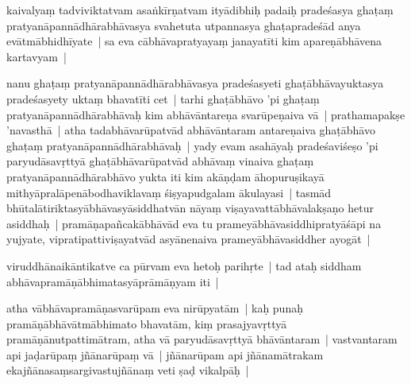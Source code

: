 \documentclass[article,12pt,a4paper]{memoir}%
\newcounter{parCount}
\begin{document}
	  \pstart \leavevmode%
	kaivalyaṃ tadviviktatvam asaṅkīrṇatvam ityādibhiḥ padaiḥ pradeśasya ghaṭaṃ pratyanāpannādhārabhāvasya svahetuta utpannasya ghaṭapradeśād anya evātmābhidhīyate | sa eva cābhāvapratyayaṃ janayatīti kim apareṇābhāvena kartavyam |
	{}
	\pend%
      

	  \pstart \leavevmode%
	\label{thakur75-104.24}nanu ghaṭaṃ pratyanāpannādhārabhāvasya pradeśasyeti ghaṭābhāvayuktasya pradeśasyety uktaṃ bhavatīti cet | tarhi ghaṭābhāvo 'pi ghaṭaṃ pratyanāpannādhārabhāvaḥ kim abhāvāntareṇa svarūpeṇaiva vā | prathamapakṣe 'navasthā | atha tadabhāvarūpatvād abhāvāntaram antareṇaiva ghaṭābhāvo ghaṭaṃ pratyanāpannādhārabhāvaḥ | yady evam asahāyaḥ pradeśaviśeṣo 'pi paryudāsavṛttyā ghaṭābhāvarūpatvād abhāvaṃ vinaiva ghaṭaṃ pratyanāpannādhārabhāvo yukta iti kim akāṇḍam āhopuruṣikayā mithyāpralāpenābodhaviklavaṃ śiṣyapudgalam ākulayasi | tasmād bhūtalātiriktasyābhāvasyāsiddhatvān nāyaṃ viṣayavattābhāvalakṣaṇo hetur asiddhaḥ | pramāṇapañcakābhāvād eva tu prameyābhāvasiddhipratyāśāpi na yujyate, vipratipattiviṣayatvād asyānenaiva prameyābhāvasiddher ayogāt |
	{}
	\pend%
      

	  \pstart \leavevmode%
	\label{thakur75-104.33}viruddhānaikāntikatve ca pūrvam eva hetoḥ parihṛte | tad ataḥ siddham abhāvapramāṇābhimatasyāprāmāṇyam iti |
	{}
	\pend%
      

	  \pstart \leavevmode%
	\label{thakur75-105.1}atha vābhāvapramāṇasvarūpam eva nirūpyatām | kaḥ punaḥ pramāṇābhāvātmābhimato bhavatām, kiṃ prasajyavṛttyā pramāṇānutpattimātram, atha vā paryudāsavṛttyā bhāvāntaram | vastvantaram api jaḍarūpaṃ jñānarūpaṃ vā | jñānarūpam api jñānamātrakam ekajñānasaṃsargivastujñānaṃ veti ṣaḍ vikalpāḥ |
	{}
	\pend%
      
\end{document}
